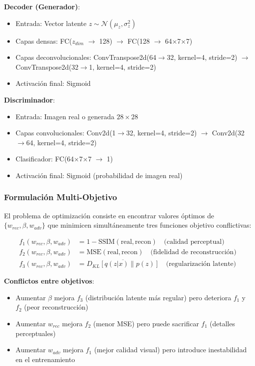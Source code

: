 \documentclass[12pt]{article}
\begin{document}
\textbf{Decoder (Generador)}:
\begin{itemize}
    \item Entrada: Vector latente $z \sim \mathcal{N}(\mu_z, \sigma^2_z)$
    \item Capas densas: FC($z_{dim}$ $\to$ 128) $\to$ FC(128 $\to$ 64$\times$7$\times$7)
    \item Capas deconvolucionales: ConvTranspose2d(64$\to$32, kernel=4, stride=2) $\to$ ConvTranspose2d(32$\to$1, kernel=4, stride=2)
    \item Activación final: Sigmoid
\end{itemize}

\textbf{Discriminador}:
\begin{itemize}
    \item Entrada: Imagen real o generada $28 \times 28$
    \item Capas convolucionales: Conv2d(1$\to$32, kernel=4, stride=2) $\to$ Conv2d(32$\to$64, kernel=4, stride=2)
    \item Clasificador: FC(64$\times$7$\times$7 $\to$ 1)
    \item Activación final: Sigmoid (probabilidad de imagen real)
\end{itemize}

\subsubsection{Formulación Multi-Objetivo}

El problema de optimización consiste en encontrar valores óptimos de $\{w_{rec}, \beta, w_{adv}\}$ que minimicen simultáneamente tres funciones objetivo conflictivas:

\begin{equation}
\begin{aligned}
f_1(w_{rec}, \beta, w_{adv}) &= 1 - \text{SSIM}(\text{real}, \text{recon}) \quad \text{(calidad perceptual)} \\
f_2(w_{rec}, \beta, w_{adv}) &= \text{MSE}(\text{real}, \text{recon}) \quad \text{(fidelidad de reconstrucción)} \\
f_3(w_{rec}, \beta, w_{adv}) &= \overline{D_{KL}[q(z|x) \| p(z)]} \quad \text{(regularización latente)}
\end{aligned}
\end{equation}

\textbf{Conflictos entre objetivos}:
\begin{itemize}
    \item Aumentar $\beta$ mejora $f_3$ (distribución latente más regular) pero deteriora $f_1$ y $f_2$ (peor reconstrucción)
    \item Aumentar $w_{rec}$ mejora $f_2$ (menor MSE) pero puede sacrificar $f_1$ (detalles perceptuales)
    \item Aumentar $w_{adv}$ mejora $f_1$ (mejor calidad visual) pero introduce inestabilidad en el entrenamiento
\end{itemize}
\end{document}
